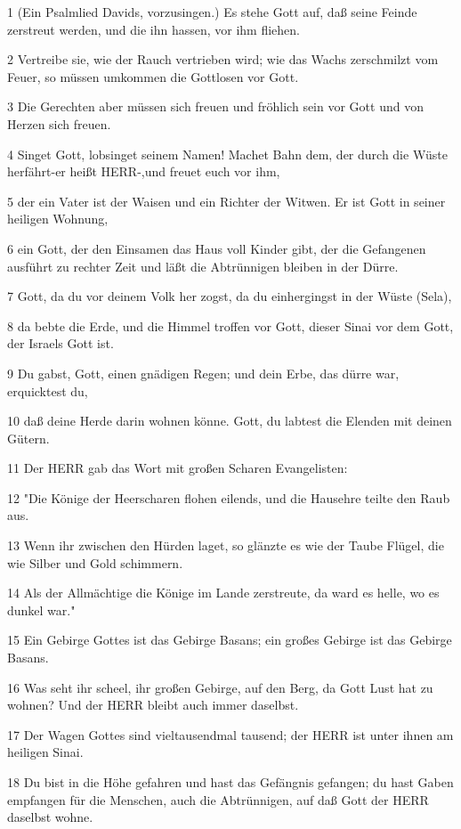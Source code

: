 \par 1 (Ein Psalmlied Davids, vorzusingen.) Es stehe Gott auf, daß seine Feinde zerstreut werden, und die ihn hassen, vor ihm fliehen.
\par 2 Vertreibe sie, wie der Rauch vertrieben wird; wie das Wachs zerschmilzt vom Feuer, so müssen umkommen die Gottlosen vor Gott.
\par 3 Die Gerechten aber müssen sich freuen und fröhlich sein vor Gott und von Herzen sich freuen.
\par 4 Singet Gott, lobsinget seinem Namen! Machet Bahn dem, der durch die Wüste herfährt-er heißt HERR-,und freuet euch vor ihm,
\par 5 der ein Vater ist der Waisen und ein Richter der Witwen. Er ist Gott in seiner heiligen Wohnung,
\par 6 ein Gott, der den Einsamen das Haus voll Kinder gibt, der die Gefangenen ausführt zu rechter Zeit und läßt die Abtrünnigen bleiben in der Dürre.
\par 7 Gott, da du vor deinem Volk her zogst, da du einhergingst in der Wüste (Sela),
\par 8 da bebte die Erde, und die Himmel troffen vor Gott, dieser Sinai vor dem Gott, der Israels Gott ist.
\par 9 Du gabst, Gott, einen gnädigen Regen; und dein Erbe, das dürre war, erquicktest du,
\par 10 daß deine Herde darin wohnen könne. Gott, du labtest die Elenden mit deinen Gütern.
\par 11 Der HERR gab das Wort mit großen Scharen Evangelisten:
\par 12 "Die Könige der Heerscharen flohen eilends, und die Hausehre teilte den Raub aus.
\par 13 Wenn ihr zwischen den Hürden laget, so glänzte es wie der Taube Flügel, die wie Silber und Gold schimmern.
\par 14 Als der Allmächtige die Könige im Lande zerstreute, da ward es helle, wo es dunkel war."
\par 15 Ein Gebirge Gottes ist das Gebirge Basans; ein großes Gebirge ist das Gebirge Basans.
\par 16 Was seht ihr scheel, ihr großen Gebirge, auf den Berg, da Gott Lust hat zu wohnen? Und der HERR bleibt auch immer daselbst.
\par 17 Der Wagen Gottes sind vieltausendmal tausend; der HERR ist unter ihnen am heiligen Sinai.
\par 18 Du bist in die Höhe gefahren und hast das Gefängnis gefangen; du hast Gaben empfangen für die Menschen, auch die Abtrünnigen, auf daß Gott der HERR daselbst wohne.
